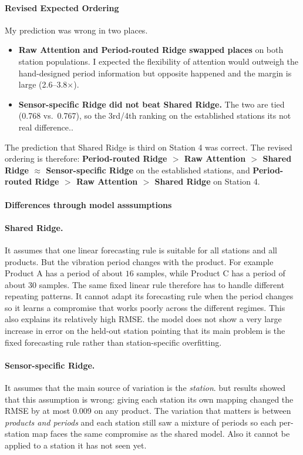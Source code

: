 \documentclass[a4, 12pt]{article}
\begin{document}
\paragraph{Revised Expected Ordering}
My prediction was wrong in two places.
\begin{itemize}
  \item \textbf{Raw Attention and Period-routed Ridge swapped places} on both station
  populations. I expected the flexibility of attention would outweigh the hand-designed
  period information but opposite happened and the margin is large (2.6--3.8$\times$).
  \item \textbf{Sensor-specific Ridge did not beat Shared Ridge.} The two are tied
  (0.768 vs.\ 0.767), so the 3rd/4th ranking on the established stations its not real difference..
\end{itemize}
The prediction that Shared Ridge is third on Station 4 was correct. The revised
ordering is therefore: \textbf{Period-routed Ridge $>$ Raw Attention $>$ Shared Ridge
$\approx$ Sensor-specific Ridge} on the established stations, and
\textbf{Period-routed Ridge $>$ Raw Attention $>$ Shared Ridge} on Station 4.

\paragraph{Differences through model asssumptions}

\paragraph{Shared Ridge.}
It assumes that one linear forecasting rule is suitable for all stations and all products. But the vibration period changes with the product. 
For example Product A has a period of about \(16\) samples, while Product C has a period of about \(30\) samples. The same fixed linear rule therefore has to handle different repeating patterns. 
It cannot adapt its forecasting rule when the period changes so it learns a compromise that works poorly across the different regimes. This also explains its relatively high RMSE. the model does not show a very large increase in error on the held-out station pointing that its main problem is the fixed forecasting rule rather than station-specific overfitting.

\paragraph{Sensor-specific Ridge.} It assumes that the main source of variation
is the \emph{station}. but results showed that this assumption is wrong: giving each
station its own mapping changed the RMSE by at most 0.009 on any product. The
variation that matters is between \emph{products and periods} and each station still
saw a mixture of periods so each per-station map faces the same compromise as the
shared model. Also it cannot be applied to a station it has not seen yet.
\end{document}
